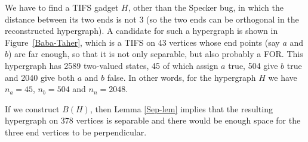 \documentclass[%
12pt,
prereprint,
showpacs,
showkeys,
preprintnumbers,
amsmath,amssymb,
aps,
pra,
longbibliography,
notitlepage
]{revtex4-1}
\theoremstyle{definition}
\begin{document}
	We have to find a TIFS gadget $H$, other than the Specker bug, in which the distance between its two ends is not 3 (so the two ends can be orthogonal in the reconstructed hypergraph). A candidate for such a hypergraph is shown in Figure~\ref{Baba-Taher}, which is a TIFS on 43 vertices whose end points (say $a$ and $b$) are far enough, so that it is not only separable, but also probably a FOR. This hypergraph has 2589 two-valued states, 45 of which assign $a$ true, 504 give $b$ true and 2040 give both $a$ and $b$ false. In other words, for the hypergraph $H$ we have $n_a=45$, $n_b=504$ and $n_n=2048$.
	
	If we construct $B(H)$, then Lemma \ref{Sep-lem} implies that the resulting hypergraph on 378 vertices is separable and there would be enough space for the three end vertices to be perpendicular.
	
\end{document}
